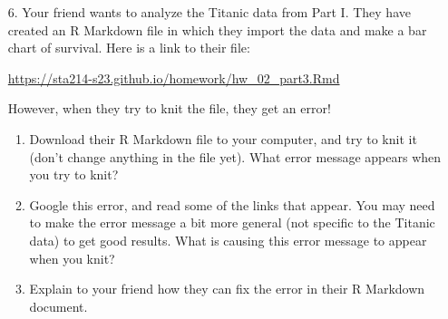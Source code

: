 \documentclass[11pt]{article}
\begin{document}
\begin{enumerate}
\item[6.] Your friend wants to analyze the Titanic data from Part I. They have created an R Markdown file in which they import the data and make a bar chart of survival. Here is a link to their file:

\url{https://sta214-s23.github.io/homework/hw_02_part3.Rmd}

However, when they try to knit the file, they get an error!

\begin{enumerate}
\item Download their R Markdown file to your computer, and try to knit it (don't change anything in the file yet). What error message appears when you try to knit?

\item Google this error, and read some of the links that appear. You may need to make the error message a bit more general (not specific to the Titanic data) to get good results. What is causing this error message to appear when you knit?

\item Explain to your friend how they can fix the error in their R Markdown document.
\end{enumerate}

\end{enumerate}
\end{document}
